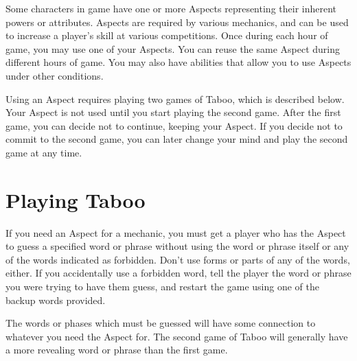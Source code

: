 \documentclass[green]{guardians}
\begin{document}
\name{\gAspect{}}

Some characters in game have one or more Aspects representing their inherent powers or attributes. Aspects are required by various mechanics, and can be used to increase a player's skill at various competitions. Once during each hour of game, you may use one of your Aspects. You can reuse the same Aspect during different hours of game. You may also have abilities that allow you to use Aspects under other conditions.

Using an Aspect requires playing two games of Taboo, which is described below. Your Aspect is not used until you start playing the second game. After the first game, you can decide not to continue, keeping your Aspect. If you decide not to commit to the second game, you can later change your mind and play the second game at any time.



\section*{Playing Taboo}

If you need an Aspect for a mechanic, you must get a player who has the Aspect to guess a specified word or phrase without using the word or phrase itself or any of the words indicated as forbidden. Don't use forms or parts of any of the words, either. If you accidentally use a forbidden word, tell the player the word or phrase you were trying to have them guess, and restart the game using one of the backup words provided.

The words or phases which must be guessed will have some connection to whatever you need the Aspect for. The second game of Taboo will generally have a more revealing word or phrase than the first game.

\end{document}
